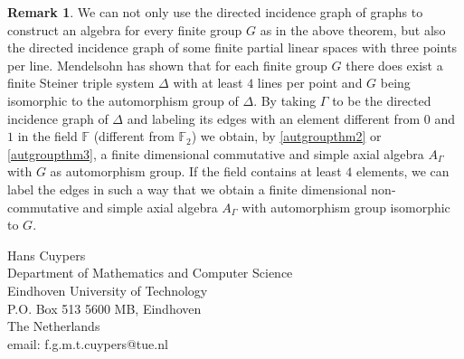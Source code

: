 \documentclass[oneside,a4paper]{amsart} %
\theoremstyle{definition}
\newtheorem{remark}[proposition]{Remark}
\begin{document}
\begin{remark}
We can not only use the directed incidence graph of graphs to construct an algebra for every finite group $G$ as in the above theorem, 
but also  the directed incidence graph of some finite partial linear spaces with three points per line.
Mendelsohn \cite{mendelsohn} has shown that for each finite group $G$ there does exist a finite Steiner triple system $\Delta$ with at least $4$ lines per point and $G$ being isomorphic to the automorphism group of $\Delta$.
By taking $\Gamma$ to be the directed  incidence graph of $\Delta$ and labeling its edges with an element different from  $0$ and $1$ in the field $\mathbb{F}$ (different from $\mathbb{F}_2$)  we obtain, by  \cref{autgroupthm2} or \cref{autgroupthm3}, a finite dimensional commutative and simple axial algebra $A_\Gamma$
with $G$ as automorphism group.
If the field contains at least $4$ elements, we can label the edges in such a way that we obtain a finite dimensional non-commutative and simple axial algebra
$A_\Gamma$ with automorphism group isomorphic to $G$.
\end{remark}

\bigskip







\vspace{2cm}


\parindent=0pt
Hans Cuypers\\
Department of Mathematics and Computer Science \\
Eindhoven University of Technology\\
P.O. Box 513 5600 MB, Eindhoven\\
The Netherlands\\
email: f.g.m.t.cuypers@tue.nl
\end{document}

